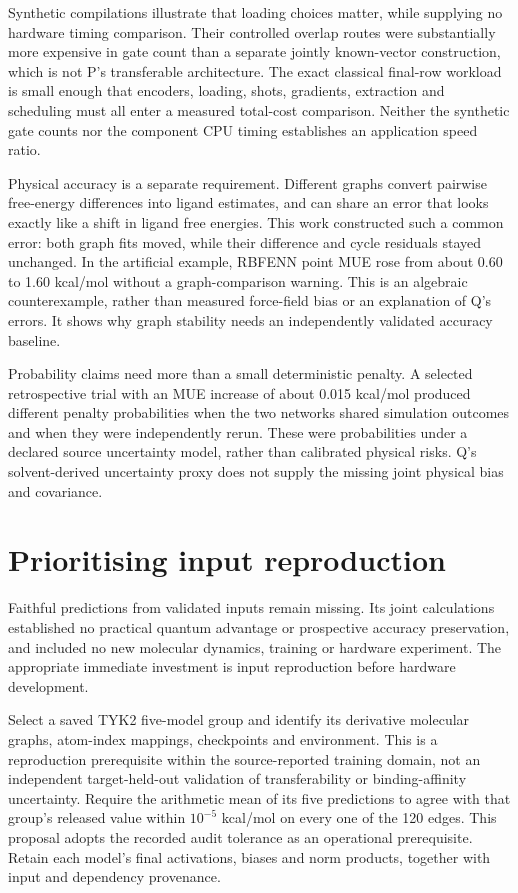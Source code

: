 \documentclass{article}
\begin{document}
Synthetic compilations illustrate that loading choices matter, while supplying no hardware timing comparison. Their controlled overlap routes were substantially more expensive in gate count than a separate jointly known-vector construction, which is not P's transferable architecture. The exact classical final-row workload is small enough that encoders, loading, shots, gradients, extraction and scheduling must all enter a measured total-cost comparison. Neither the synthetic gate counts nor the component CPU timing establishes an application speed ratio.

Physical accuracy is a separate requirement. Different graphs convert pairwise free-energy differences into ligand estimates, and can share an error that looks exactly like a shift in ligand free energies. This work constructed such a common error: both graph fits moved, while their difference and cycle residuals stayed unchanged. In the artificial example, RBFENN point MUE rose from about 0.60 to 1.60 kcal/mol without a graph-comparison warning. This is an algebraic counterexample, rather than measured force-field bias or an explanation of Q's errors. It shows why graph stability needs an independently validated accuracy baseline.

Probability claims need more than a small deterministic penalty. A selected retrospective trial with an MUE increase of about 0.015 kcal/mol produced different penalty probabilities when the two networks shared simulation outcomes and when they were independently rerun. These were probabilities under a declared source uncertainty model, rather than calibrated physical risks. Q's solvent-derived uncertainty proxy does not supply the missing joint physical bias and covariance.

\section{Prioritising input reproduction}

Faithful predictions from validated inputs remain missing. Its joint calculations established no practical quantum advantage or prospective accuracy preservation, and included no new molecular dynamics, training or hardware experiment. The appropriate immediate investment is input reproduction before hardware development.

Select a saved TYK2 five-model group and identify its derivative molecular graphs, atom-index mappings, checkpoints and environment. This is a reproduction prerequisite within the source-reported training domain, not an independent target-held-out validation of transferability or binding-affinity uncertainty. Require the arithmetic mean of its five predictions to agree with that group's released value within \(10^{-5}\) kcal/mol on every one of the 120 edges. This proposal adopts the recorded audit tolerance as an operational prerequisite. Retain each model's final activations, biases and norm products, together with input and dependency provenance.
\end{document}
